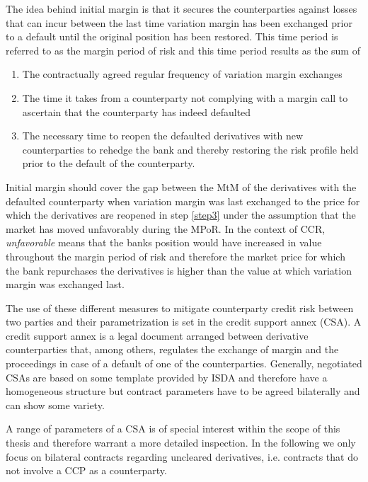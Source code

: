 \documentclass[../Thesis_AHoecherl.tex]{subfiles}
\begin{document}
The idea behind initial margin is that it secures the counterparties against losses that can incur between the last time variation margin has been exchanged prior to a default until the original position has been restored. This time period is referred to as the margin period of risk and this time period results as the sum of
\begin{enumerate}
    \item The contractually agreed regular frequency of variation margin exchanges
    \item The time it takes from a counterparty not complying with a margin call to ascertain that the counterparty has indeed defaulted
    \item The necessary time to reopen the defaulted derivatives with new counterparties to rehedge the bank and thereby restoring the risk profile held prior to the default of the counterparty.\label{step3}
\end{enumerate}
Initial margin should cover the gap between the \gls{MtM} of the derivatives with the defaulted counterparty when variation margin was last exchanged to the price for which the derivatives are reopened in step \ref{step3} under the assumption that the market has moved unfavorably during the \gls{MPoR}. In the context of CCR, \emph{unfavorable} means that the banks position would have increased in value throughout the margin period of risk and therefore the market price for which the bank repurchases the derivatives is higher than the value at which variation margin was exchanged last.

The use of these different measures to mitigate counterparty credit risk between two parties and their parametrization is set in the credit support annex (\gls{CSA}). 
A credit support annex is a legal document arranged between derivative counterparties that, among others, regulates the exchange of margin and the proceedings in case of a default of one of the counterparties.
Generally, negotiated CSAs are based on some template provided by \gls{ISDA} and therefore have a homogeneous structure but contract parameters have to be agreed bilaterally and can show some variety.

A range of parameters of a \gls{CSA} is of special interest within the scope of this thesis and therefore warrant a more detailed inspection. 
In the following we only focus on bilateral contracts regarding uncleared derivatives, i.e. contracts that do not involve a \gls{CCP} as a counterparty.
\end{document}
